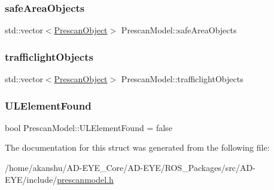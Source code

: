 \subsubsection{\texorpdfstring{safe\+Area\+Objects}{safeAreaObjects}}
{\footnotesize\ttfamily std\+::vector$<$\hyperlink{structPrescanObject}{Prescan\+Object}$>$ Prescan\+Model\+::safe\+Area\+Objects}

\mbox{\label{structPrescanModel_aaf9cd990920b3c18a5d44fcae199b423}} 
\subsubsection{\texorpdfstring{trafficlight\+Objects}{trafficlightObjects}}
{\footnotesize\ttfamily std\+::vector$<$\hyperlink{structPrescanObject}{Prescan\+Object}$>$ Prescan\+Model\+::trafficlight\+Objects}

\mbox{\label{structPrescanModel_a47982a5c335b6b3ec656027d7b1afa8b}} 
\subsubsection{\texorpdfstring{U\+L\+Element\+Found}{ULElementFound}}
{\footnotesize\ttfamily bool Prescan\+Model\+::\+U\+L\+Element\+Found = false}



The documentation for this struct was generated from the following file\+:\begin{DoxyCompactItemize}
\item 
/home/akanshu/\+A\+D-\/\+E\+Y\+E\+\_\+\+Core/\+A\+D-\/\+E\+Y\+E/\+R\+O\+S\+\_\+\+Packages/src/\+A\+D-\/\+E\+Y\+E/include/\hyperlink{prescanmodel_8h}{prescanmodel.\+h}\end{DoxyCompactItemize}
